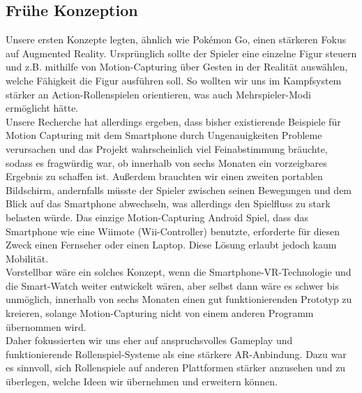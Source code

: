 \documentclass[extern,palatino]{cgBA}
\begin{document}
	\subsection{Frühe Konzeption}
	Unsere ersten Konzepte legten, ähnlich wie Pokémon Go, einen stärkeren Fokus auf Augmented Reality. Ursprünglich sollte der Spieler eine einzelne Figur steuern und z.B. mithilfe von Motion-Capturing über Gesten in der Realität auswählen, welche Fähigkeit die Figur ausführen soll. So wollten wir uns im Kampfsystem stärker an Action-Rollenspielen orientieren, was auch Mehrspieler-Modi ermöglicht hätte.
	\\Unsere Recherche hat allerdings ergeben, dass bisher existierende Beispiele für Motion Capturing mit dem Smartphone durch Ungenauigkeiten Probleme verursachen und das Projekt wahrscheinlich viel Feinabstimmung bräuchte, sodass es fragwürdig war, ob innerhalb von sechs Monaten ein vorzeigbares Ergebnis zu schaffen ist. Außerdem brauchten wir einen zweiten portablen Bildschirm, andernfalls müsste der Spieler zwischen seinen Bewegungen und dem Blick auf das Smartphone abwechseln, was allerdings den Spielfluss zu stark belasten würde. Das einzige Motion-Capturing Android Spiel, dass das Smartphone wie eine Wiimote (Wii-Controller) benutzte, erforderte für diesen Zweck einen Fernseher oder einen Laptop. Diese Lösung erlaubt jedoch kaum Mobilität.
	\\Vorstellbar wäre ein solches Konzept, wenn die Smartphone-VR-Technologie und die Smart-Watch weiter entwickelt wären, aber selbst dann wäre es schwer bis unmöglich, innerhalb von sechs Monaten einen gut funktionierenden Prototyp zu kreieren, solange Motion-Capturing nicht von einem anderen Programm übernommen wird.
\\Daher fokussierten wir uns eher auf anspruchsvolles Gameplay und funktionierende Rollenspiel-Systeme als eine stärkere AR-Anbindung. Dazu war es sinnvoll, sich Rollenspiele auf anderen Plattformen stärker anzusehen und zu überlegen, welche Ideen wir übernehmen und erweitern können.
\newpage
\end{document}
